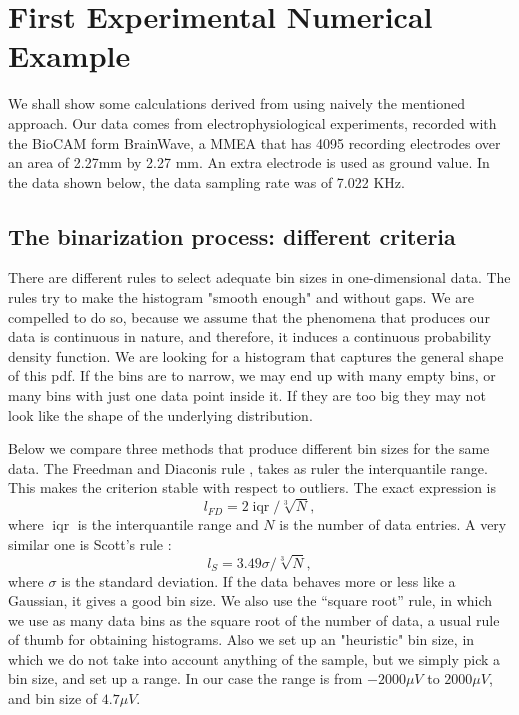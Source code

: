 \documentclass[10pt]{article}
\DeclareMathOperator{\iqr}{iqr}
\begin{document}
\section{ First Experimental Numerical Example }

We shall show some calculations derived from using naively the mentioned approach. Our data comes from electrophysiological experiments, recorded with the BioCAM form BrainWave, a MMEA that has 4095 recording electrodes over an area of 2.27mm by 2.27 mm. An extra
electrode is used as ground value. In the data shown below, the data sampling rate was of 7.022 KHz.

\subsection{The binarization process: different criteria}

There are different rules to select adequate bin sizes in one-dimensional data. The rules try to make the histogram "smooth enough" and without gaps. We are compelled to do so, because we assume that the phenomena that produces our data is continuous in nature, and therefore, it induces a continuous probability density function. We are looking for a histogram that captures the general shape of this pdf. If the bins are to narrow, we may end up with many empty bins, or many bins with just one data point inside it. If they are too big they may not look like the shape of the underlying distribution.

Below we compare three  methods that produce different bin sizes for the same data.
The Freedman and Diaconis rule \cite{FD1981}, takes as ruler the interquantile
range. This makes the criterion stable with respect to outliers. The exact expression
is
\begin{equation}
  l_{FD}=2 \iqr / \sqrt[3]{N},
\end{equation}
where $\iqr$ is the interquantile range and $N$ is the number of data entries.
A very similar one is Scott's rule \cite{Scott1979}:
\begin{equation}
  l_{S}=3.49 \sigma / \sqrt[3]{N},
\end{equation}
where $\sigma$ is the standard deviation. If the data behaves more or less like a
Gaussian, it gives a good bin size.
We also use the ``square root'' rule, in which we use as many data bins as the
square root of the number of data, a usual rule of thumb for obtaining histograms.
Also we set up an "heuristic" bin size, in which we do not take into account anything of the sample, but we simply pick a bin size, and set up a range. In our case the range is from $-2000 \mu V$ to $2000 \mu V$, and bin size of $4.7 \mu V$.
\end{document}
